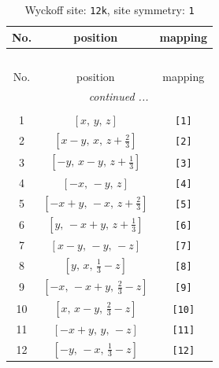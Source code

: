 \documentclass[fleqn,8pt]{jsarticle}
\begin{document}
\renewcommand{\arraystretch}{1.2}
\begin{longtable}{ccc}
\caption{Wyckoff site: {\tt 12k}, site symmetry: {\tt 1}}
 \\
 \hline \hline
No. & position & mapping \\ \hline \endfirsthead

\multicolumn{2}{l}{\tablename\ \thetable{}} \\
 \hline \hline
No. & position & mapping \\ \hline \endhead

 \hline \hline
\multicolumn{2}{r}{\footnotesize\it continued ...} \\ \endfoot

 \hline \hline
\multicolumn{2}{r}{} \\ \endlastfoot

1 & $\left[ x,\, y,\, z \right]$ & {\tt [1]} \\ \hline
2 & $\left[ x - y,\, x,\, z + \frac{2}{3} \right]$ & {\tt [2]} \\ \hline
3 & $\left[ - y,\, x - y,\, z + \frac{1}{3} \right]$ & {\tt [3]} \\ \hline
4 & $\left[ - x,\, - y,\, z \right]$ & {\tt [4]} \\ \hline
5 & $\left[ - x + y,\, - x,\, z + \frac{2}{3} \right]$ & {\tt [5]} \\ \hline
6 & $\left[ y,\, - x + y,\, z + \frac{1}{3} \right]$ & {\tt [6]} \\ \hline
7 & $\left[ x - y,\, - y,\, - z \right]$ & {\tt [7]} \\ \hline
8 & $\left[ y,\, x,\, \frac{1}{3} - z \right]$ & {\tt [8]} \\ \hline
9 & $\left[ - x,\, - x + y,\, \frac{2}{3} - z \right]$ & {\tt [9]} \\ \hline
10 & $\left[ x,\, x - y,\, \frac{2}{3} - z \right]$ & {\tt [10]} \\ \hline
11 & $\left[ - x + y,\, y,\, - z \right]$ & {\tt [11]} \\ \hline
12 & $\left[ - y,\, - x,\, \frac{1}{3} - z \right]$ & {\tt [12]} \\
\end{longtable}
\end{document}
